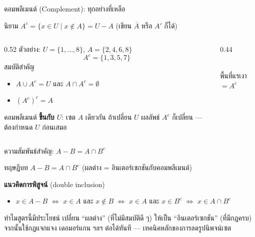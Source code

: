 \begin{frame}{คอมพลีเมนต์ (Complement): ทุกอย่างที่เหลือ}
  \begin{block}{นิยาม}
    $A^c = \{x \in U \mid x \notin A\} = U - A$ \quad (เขียน $\overline{A}$ หรือ $A'$ ก็ได้)
  \end{block}
  \begin{columns}[T]
    \begin{column}{0.52\textwidth}
      ตัวอย่าง: $U = \{1,\ldots,8\}$, $A = \{2,4,6,8\}$
      \[ A^c = \{1, 3, 5, 7\} \]
      สมบัติสำคัญ
      \begin{itemize}\small
        \item $A \cup A^c = U$ \quad และ \quad $A \cap A^c = \emptyset$
        \item $(A^c)^c = A$ 
      \end{itemize}
      \begin{alertblock}{}\small
        คอมพลีเมนต์ \textbf{ขึ้นกับ $U$}: เซต $A$ เดียวกัน ถ้าเปลี่ยน $U$
        ผลลัพธ์ $A^c$ ก็เปลี่ยน --- ต้องกำหนด $U$ ก่อนเสมอ
      \end{alertblock}
    \end{column}
    \begin{column}{0.44\textwidth}
      \begin{center}
      \\
      พื้นที่แรเงา $= A^c$
      \end{center}
    \end{column}
  \end{columns}
\end{frame}

\begin{frame}{ความสัมพันธ์สำคัญ: $A - B = A \cap B^c$}
  \begin{block}{ทฤษฎีบท}
    \centering $A - B = A \cap B^c$ \quad (ผลต่าง = อินเตอร์เซกชันกับคอมพลีเมนต์)
  \end{block}
  \vspace{0.3em}
  \textbf{แนวคิดการพิสูจน์} (double inclusion)
  \begin{itemize}
    \item $x \in A - B$ \;$\Leftrightarrow$\; $x \in A$ และ $x \notin B$
          \;$\Leftrightarrow$\; $x \in A$ และ $x \in B^c$
          \;$\Leftrightarrow$\; $x \in A \cap B^c$
  \end{itemize}
  \vspace{0.4em}
  \begin{exampleblock}{ทำไมสูตรนี้มีประโยชน์}
    เปลี่ยน ``ผลต่าง'' (ที่ไม่มีสมบัติดี ๆ) ให้เป็น ``อินเตอร์เซกชัน'' (ที่มีกฎครบ)
    จากนั้นใช้กฎแจกแจง เดอมอร์แกน ฯลฯ ต่อได้ทันที --- เทคนิคหลักของการลดรูปนิพจน์เซต
  \end{exampleblock}
\end{frame}

